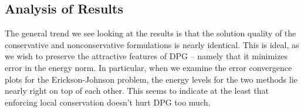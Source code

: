 \documentclass[letterpaper]{article}
\def\bbeta{\boldsymbol\beta}
\begin{document}
%
%
%

\subsection{Analysis of Results}\label{sec:problemAnalysis}
The general trend we see looking at the results is that the solution quality
of the conservative and nonconservative formulations is nearly identical. This
is ideal, as we wish to preserve the attractive features of DPG --
namely that it minimizes error in the energy norm. In particular, when we
examine the error convergence plots for the Erickson-Johnson problem, the
energy levels for the two methods lie nearly right on top of each other. This
seems to indicate at the least that enforcing local conservation doesn't hurt
DPG too much.
\end{document}
